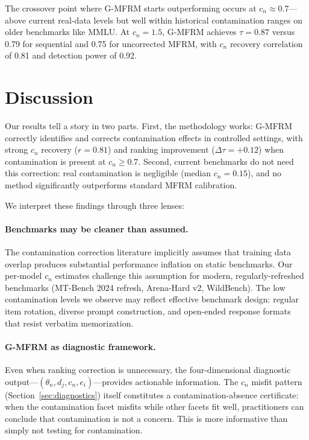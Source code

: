 \documentclass[11pt]{article}
\begin{document}
The crossover point where G-MFRM starts outperforming occurs at $c_n \approx 0.7$---above current real-data levels but well within historical contamination ranges on older benchmarks like MMLU.
At $c_n = 1.5$, G-MFRM achieves $\tau = 0.87$ versus 0.79 for sequential and 0.75 for uncorrected MFRM, with $c_n$ recovery correlation of 0.81 and detection power of 0.92.

\section{Discussion}

Our results tell a story in two parts.
First, the methodology works: G-MFRM correctly identifies and corrects contamination effects in controlled settings, with strong $c_n$ recovery ($r = 0.81$) and ranking improvement ($\Delta\tau = +0.12$) when contamination is present at $c_n \geq 0.7$.
Second, current benchmarks do not need this correction: real contamination is negligible (median $c_n = 0.15$), and no method significantly outperforms standard MFRM calibration.

We interpret these findings through three lenses:

\paragraph{Benchmarks may be cleaner than assumed.}
The contamination correction literature implicitly assumes that training data overlap produces substantial performance inflation on static benchmarks.
Our per-model $c_n$ estimates challenge this assumption for modern, regularly-refreshed benchmarks (MT-Bench 2024 refresh, Arena-Hard v2, WildBench).
The low contamination levels we observe may reflect effective benchmark design: regular item rotation, diverse prompt construction, and open-ended response formats that resist verbatim memorization.

\paragraph{G-MFRM as diagnostic framework.}
Even when ranking correction is unnecessary, the four-dimensional diagnostic output---$(\theta_n, d_j, c_n, e_i)$---provides actionable information.
The $c_n$ misfit pattern (Section~\ref{sec:diagnostics}) itself constitutes a contamination-absence certificate: when the contamination facet misfits while other facets fit well, practitioners can conclude that contamination is not a concern.
This is more informative than simply not testing for contamination.
\end{document}

